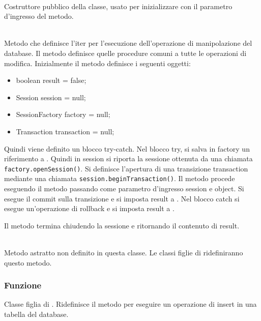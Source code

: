 \begin{description}
	\item{}\\
	Costruttore pubblico della classe, usato per inizializzare  con il parametro d'ingresso del metodo.
	
	\item{}\\
	Metodo che definisce l'iter per l'esecuzione dell'operazione di manipolazione del database. Il metodo definisce quelle procedure comuni a tutte le operazioni di modifica. Inizialmente il metodo definisce i seguenti oggetti:
	\begin{itemize}
		\item boolean result = false;
		\item Session session = null;
		\item SessionFactory factory = null;
		\item Transaction transaction = null;
	\end{itemize}
	
Quindi viene definito un blocco try-catch. Nel blocco try, si salva in factory un riferimento a . Quindi in session si riporta la sessione ottenuta da una chiamata \verb|factory.openSession()|. Si definisce l'apertura di una transizione transaction mediante una chiamata \verb|session.beginTransaction()|. Il metodo procede eseguendo il metodo  passando come parametro d'ingresso session e object. Si esegue il commit sulla transizione e si imposta result a . Nel blocco catch si esegue un'operazione di rollback e si imposta result a .

Il metodo termina chiudendo la sessione e ritornando il contenuto di result.

	\item{}\\
	Metodo astratto non definito in questa classe. Le classi figlie di  ridefiniranno questo metodo.

\end{description}


\subsubsection*{Funzione}
Classe figlia di . Ridefinisce il metodo  per eseguire un operazione di insert in una tabella del database.


